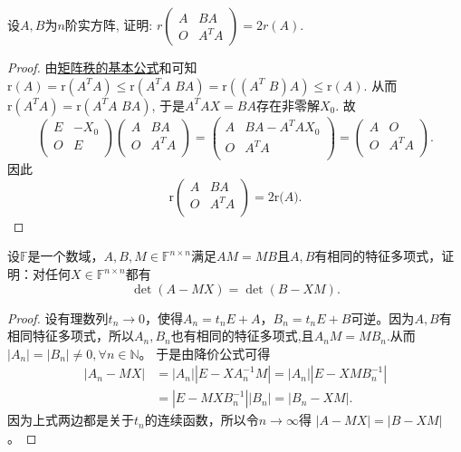 \documentclass[../../main.tex]{subfiles}%
\begin{document}
\begin{example}
设$A,B$为$n$阶实方阵, 证明: $r\begin{pmatrix} A & BA \\ O & A^{T}A \end{pmatrix}=2r(A)$.
\end{example}
\begin{proof}

由\hyperref[proposition:矩阵秩的基本公式]{矩阵秩的基本公式}和可知
$\mathrm{r}\left( A \right) =\mathrm{r}\left( A^TA \right) \leqslant \mathrm{r}\left( A^TA\,\,BA \right) =\mathrm{r}\left( \left( A^T\,\,B \right) A \right) \leqslant \mathrm{r}\left( A \right) .$
从而$\mathrm{r}\left( A^TA \right) =\mathrm{r}\left( A^TA\,\,BA \right) $, 于是$A^TAX=BA$存在非零解$X_0$. 故
$$\left( \begin{matrix}
E&		-X_0\\
O&		E\\
\end{matrix} \right) \left( \begin{matrix}
A&		BA\\
O&		A^{T}A\\
\end{matrix} \right) =\left( \begin{matrix}
A&		BA-A^TAX_0\\
O&		A^{T}A\\
\end{matrix} \right) =\left( \begin{matrix}
A&		O\\
O&		A^{T}A\\
\end{matrix} \right) .$$
因此
$$\mathrm{r}\left( \begin{matrix}
A&		BA\\
O&		A^{T}A\\
\end{matrix} \right) =2\mathrm{r(}A).$$

\end{proof}

\begin{example}
设$\mathbb{F}$是一个数域，$A,B,M \in \mathbb{F}^{n \times n}$满足$AM = MB$且$A,B$有相同的特征多项式，证明：对任何$X \in \mathbb{F}^{n \times n}$都有
\[
\det (A - MX) = \det (B - XM). 
\]
\end{example}
\begin{proof}

设有理数列$t_n\rightarrow 0$，使得$A_n=t_nE+A$，$B_n=t_nE+B$可逆。因为$A,B$有相同特征多项式，所以$A_n,B_n$也有相同的特征多项式,且$A_nM=MB_n$.从而 $|A_n|=|B_n|\ne 0,\forall n\in \mathbb{N}$。
于是由降价公式可得
\begin{align*}
|A_n - MX| &= |A_n| |E - X A_n^{-1} M| = |A_n| |E - X M B_n^{-1}| \\
&= |E - M X B_n^{-1}| |B_n| = |B_n - X M|.
\end{align*}
因为上式两边都是关于$t_n$的连续函数，所以令$n\rightarrow \infty$得 $|A - MX| = |B - X M|$。

\end{proof}
\end{document}
